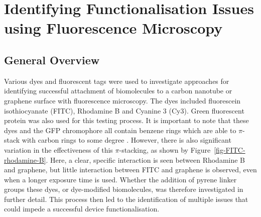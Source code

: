 \documentclass[
  a4paper,
]{scrbook}
\begin{document}
\hypertarget{sec-impediments}{%
\section{Identifying Functionalisation Issues using Fluorescence
Microscopy}\label{sec-impediments}}

\hypertarget{sec-fluorescence-remarks}{%
\subsection{General Overview}\label{sec-fluorescence-remarks}}

Various dyes and fluorescent tags were used to investigate approaches
for identifying successful attachment of biomolecules to a carbon
nanotube or graphene surface with fluorescence microscopy. The dyes
included fluorescein isothiocyanate (FITC), Rhodamine B and Cyanine 3
(Cy3). Green fluorescent protein was also used for this testing process.
It is important to note that these dyes and the GFP chromophore all
contain benzene rings which are able to \(\pi\)-stack with carbon rings
to some degree
\autocite{Nakayama-Ratchford2007,Tang2012,Khrenova2019,Qiu2019}.
However, there is also significant variation in the effectiveness of
this \(\pi\)-stacking, as shown by Figure~\ref{fig-FITC-rhodamine-B}.
Here, a clear, specific interaction is seen between Rhodamine B and
graphene, but little interaction between FITC and graphene is observed,
even when a longer exposure time is used. Whether the addition of pyrene
linker groups these dyes, or dye-modified biomolecules, was therefore
investigated in further detail. This process then led to the
identification of multiple issues that could impede a successful device
functionalisation.
\end{document}
